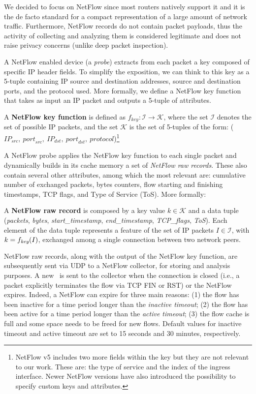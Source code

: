 \documentclass[10pt,conference,compsocconf,letterpaper]{IEEEtran}
\begin{document}
We decided to focus on NetFlow since most routers natively support it 
and it is the de facto standard for a compact representation of a large
amount of network traffic.  Furthermore, NetFlow records do not 
contain packet payloads, thus the activity of collecting and analyzing them 
is considered legitimate and does not raise privacy concerns (unlike deep packet
inspection). 

A NetFlow enabled device (a \textit{probe}) extracts from each
packet a key composed of specific IP header fields. To simplify the
exposition, we can think to this key as a 5-tuple containing IP
source and destination addresses, source and
destination ports, and the protocol used. More formally, we define a NetFlow 
key function that takes as input an IP packet and outputs a
5-tuple of attributes.
\begin{definition}
  A \textbf{NetFlow key function} \textbf{\fkey} is defined as
  $f_{\textit{key}}: \mathcal{I} \rightarrow \mathcal{K}$, where the
  set $\mathcal{I}$ denotes the set of possible IP packets, and the
  set $\mathcal{K}$ is the set of 5-tuples of the form:
  ($\mathit{IP}_{\mathit{src}},\ \mathit{port}_{\mathit{src}},\
  \mathit{IP}_{\mathit{dst}},\ \mathit{port}_{\mathit{dst}},\
  \textit{protocol}$)\footnote{\small NetFlow v5 includes two more
    fields within the key but they are not relevant to our work. These
    are: the type of service and the index of the ingress
    interface. Newer NetFlow versions have also introduced the
    possibility to specify custom keys and attributes.}
\end{definition}
A NetFlow probe applies the NetFlow key
function to each single packet and dynamically builds in its cache
memory a set of \emph{NetFlow raw records}. These also contain several other attributes, among which
the most relevant are: cumulative number of exchanged packets, bytes counters, flow starting and finishing
timestamps, TCP flags, and Type of Service (ToS). 
More formally:
\begin{definition}
  A \textbf{NetFlow raw record \nfr} is composed by a key value
  $k\in \mathcal{K}$ and a data tuple (\textit{packets},
  \textit{bytes}, \textit{start\_timestamp}, \textit{end\_timestamp},
  \textit{TCP\_flags}, \textit{ToS}). Each element of the data tuple represents a
  feature of the set of IP packets $I\in \mathcal{I}$, with
  $k=f_{\textit{key}}(I)$, exchanged among a single connection between two network peers.
\end{definition}

NetFlow raw records, along with the output of the NetFlow key function,
are subsequently sent via UDP to a NetFlow collector, for storing and
analysis purposes. A new \nfr\ is sent to the collector when the connection is
closed (i.e., a packet explicitly terminates the flow via TCP FIN or RST) 
or the NetFlow expires. Indeed, a NetFlow can expire for three main reasons: 
(1) the flow has been inactive for a time period longer than the
  \textit{inactive timeout};
(2) the flow has been active for a time period longer than the
  \textit{active timeout};
(3) the flow cache is full and some space needs to be freed for new
  flows.
Default values for inactive timeout and active timeout are set to 15 seconds
and 30 minutes, respectively. 
\end{document}
